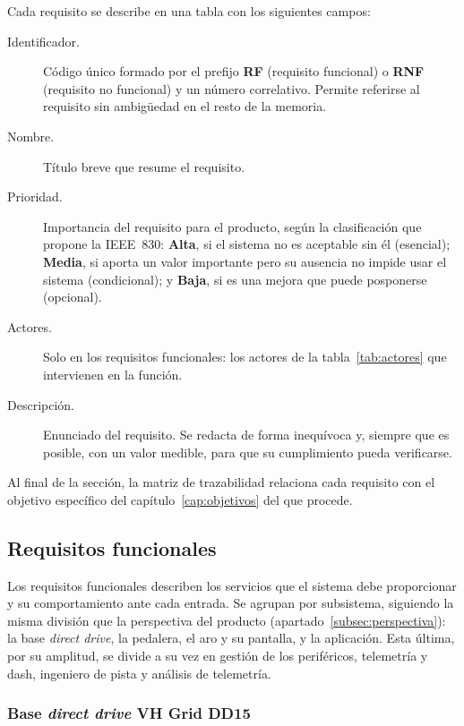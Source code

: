 Cada requisito se describe en una tabla con los siguientes campos:

\begin{description}
	\item[Identificador.] Código único formado por el prefijo \textbf{RF} (requisito funcional) o \textbf{RNF} (requisito no funcional) y un número correlativo. Permite referirse al requisito sin ambigüedad en el resto de la memoria.
	\item[Nombre.] Título breve que resume el requisito.
	\item[Prioridad.] Importancia del requisito para el producto, según la clasificación que propone la IEEE~830: \textbf{Alta}, si el sistema no es aceptable sin él (esencial); \textbf{Media}, si aporta un valor importante pero su ausencia no impide usar el sistema (condicional); y \textbf{Baja}, si es una mejora que puede posponerse (opcional).
	\item[Actores.] Solo en los requisitos funcionales: los actores de la tabla~\ref{tab:actores} que intervienen en la función.
	\item[Descripción.] Enunciado del requisito. Se redacta de forma inequívoca y, siempre que es posible, con un valor medible, para que su cumplimiento pueda verificarse.
\end{description}

Al final de la sección, la matriz de trazabilidad relaciona cada requisito con el objetivo específico del capítulo~\ref{cap:objetivos} del que procede.

\subsection{Requisitos funcionales}
\label{subsec:rf}

Los requisitos funcionales describen los servicios que el sistema debe proporcionar y su comportamiento ante cada entrada. Se agrupan por subsistema, siguiendo la misma división que la perspectiva del producto (apartado~\ref{subsec:perspectiva}): la base \emph{direct drive}, la pedalera, el aro y su pantalla, y la aplicación. Esta última, por su amplitud, se divide a su vez en gestión de los periféricos, telemetría y dash, ingeniero de pista y análisis de telemetría.

\subsubsection{Base \emph{direct drive} VH Grid DD15}

